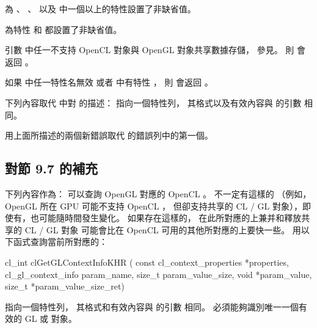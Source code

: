 \item 為 、 、
  以及  中一個以上的特性設置了非缺省值。

\item 為特性  和  都設置了非缺省值。

\item 引數  中任一不支持 OpenCL 對象與 OpenGL 對象共享數據存儲，
參見\insection[clShareGl]。
\stopigBase
則  會返回 。

如果  中任一特性名無效
或者  中有特性 ，
則  會返回 。
\stopreplacepar

下列內容取代  中對  的描述：
\startreplacepar
{} 指向一個特性列，
其格式以及有效內容與  的引數  相同。
\stopreplacepar

用上面所描述的兩個新錯誤取代  的錯誤列中的第一個。

\subsection{對節 9.7 的補充}

下列內容作為{}：
\startreplacepar
可以查詢 OpenGL 對應的 OpenCL 。
不一定有這樣的
（例如， OpenGL 所在 GPU 可能不支持 OpenCL ，
但卻支持共享的 CL / GL 對象），即使有，也可能隨時間發生變化。
如果存在這樣的，
在此所對應的上兼并和釋放共享的 CL / GL 對象
可能會比在 OpenCL 可用的其他所對應的上要快一些。
用以下函式查詢當前所對應的：


\startCLFUNC
cl_int clGetGLContextInfoKHR (
		const cl_context_properties *properties,
		cl_gl_context_info param_name,
		size_t param_value_size,
		void *param_value,
		size_t *param_value_size_ret)
\stopCLFUNC

 指向一個特性列，
其格式和有效內容與  的引數  相同。
 必須能夠識別唯一一個有效的 GL 或 對象。

